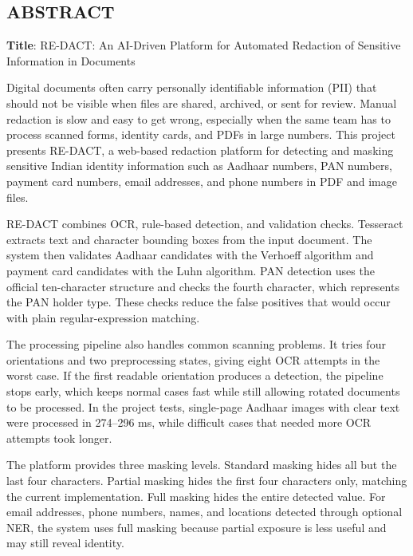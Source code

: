 \begin{center}
\chapter*{\size\textbf{ABSTRACT}}
\end{center}


\bigskip

\bigskip

\textbf{Title}: RE-DACT: An AI-Driven Platform for Automated Redaction of Sensitive Information in Documents

\bigskip

Digital documents often carry personally identifiable information (PII) that should not be visible when files are shared, archived, or sent for review. Manual redaction is slow and easy to get wrong, especially when the same team has to process scanned forms, identity cards, and PDFs in large numbers. This project presents RE-DACT, a web-based redaction platform for detecting and masking sensitive Indian identity information such as Aadhaar numbers, PAN numbers, payment card numbers, email addresses, and phone numbers in PDF and image files.

RE-DACT combines OCR, rule-based detection, and validation checks. Tesseract extracts text and character bounding boxes from the input document. The system then validates Aadhaar candidates with the Verhoeff algorithm and payment card candidates with the Luhn algorithm. PAN detection uses the official ten-character structure and checks the fourth character, which represents the PAN holder type. These checks reduce the false positives that would occur with plain regular-expression matching.

The processing pipeline also handles common scanning problems. It tries four orientations and two preprocessing states, giving eight OCR attempts in the worst case. If the first readable orientation produces a detection, the pipeline stops early, which keeps normal cases fast while still allowing rotated documents to be processed. In the project tests, single-page Aadhaar images with clear text were processed in 274--296 ms, while difficult cases that needed more OCR attempts took longer.

The platform provides three masking levels. Standard masking hides all but the last four characters. Partial masking hides the first four characters only, matching the current implementation. Full masking hides the entire detected value. For email addresses, phone numbers, names, and locations detected through optional NER, the system uses full masking because partial exposure is less useful and may still reveal identity.

